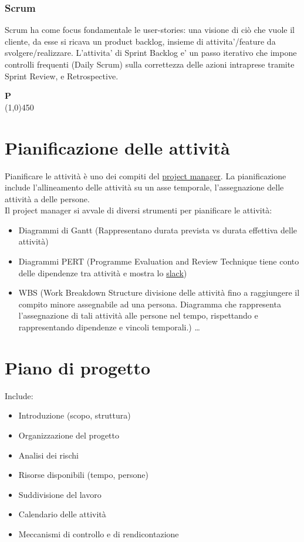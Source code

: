 \documentclass[11pt]{article}
\begin{document}
			\subsubsection{Scrum}
				Scrum ha come focus fondamentale le  user-stories: una visione di ciò che vuole il cliente, da esse si ricava un product backlog, insieme di attivita'/feature da svolgere/realizzare. L'attivita' di Sprint Backlog e' un passo iterativo che impone controlli frequenti (Daily Scrum) sulla correttezza delle azioni intraprese tramite Sprint Review, e Retrospective.\newpage

	{\Huge{\textbf{P}}} \\
	\line(1,0){450}
	

	\section{\LARGE Pianificazione delle attività}	
	\label{sec:pianificazioneattivita}
	Pianificare le attività è uno dei compiti del \hyperref[sec:projectmanager]{project manager}.
	La pianificazione include l'allineamento delle attività su un asse temporale, l'assegnazione delle attività a delle persone. \\Il project manager si avvale di diversi strumenti per pianificare le attività:  	
	\begin{itemize}  
	\item Diagrammi di Gantt (Rappresentano durata prevista vs durata effettiva delle attività)
	\item Diagrammi PERT (Programme Evaluation and Review Technique tiene conto delle dipendenze tra attività e mostra lo \hyperref[sec:slack]{slack})
	\item WBS (Work Breakdown Structure divisione delle attività fino a raggiungere il compito minore assegnabile ad una persona. Diagramma che rappresenta l'assegnazione di tali attività alle persone nel tempo, rispettando e rappresentando dipendenze e vincoli temporali.) \ldots 
	\end{itemize}	
	
	\section{\LARGE Piano di progetto}	
	\label{sec:pianoprogetto}
	Include:
	\begin{itemize}  
	\item Introduzione (scopo, struttura)
	\item Organizzazione del progetto
	\item Analisi dei rischi
	\item Risorse disponibili (tempo, persone)
	\item Suddivisione del lavoro
	\item Calendario delle attività
	\item Meccanismi di controllo e di rendicontazione	
	\end{itemize}	
		
\end{document}
